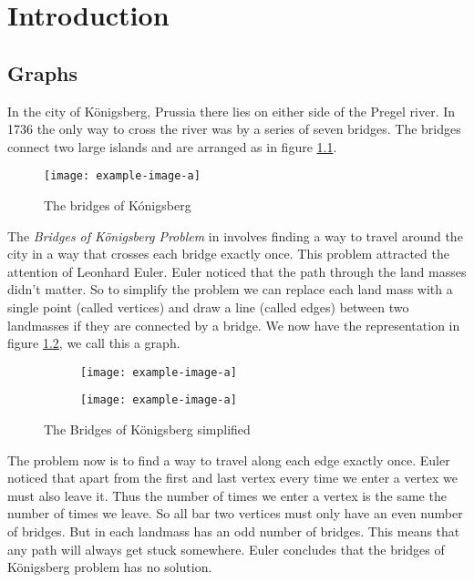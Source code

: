 \chapter{Introduction}\label{chpt:into}

\section{Graphs}
In the city of K\"{o}nigsberg, Prussia there lies on either side of the Pregel river. In 1736 the only way to cross the river was by a series of seven bridges. The bridges connect two large islands and are arranged as in figure \ref{fig:bridges1}. 
\begin{figure}[h]
    \centering
    \texttt{[image: example-image-a]}  %
    \caption{The bridges of K\'{o}nigsberg}
    \label{fig:bridges1}
\end{figure}
The \textit{Bridges of K\"{o}nigsberg Problem} in involves finding a way to travel around the city in a way that crosses each bridge exactly once. This problem attracted the attention of Leonhard Euler. Euler noticed that the path through the land masses didn't matter. So to simplify the problem we can replace each land mass with a single point (called vertices) and draw a line (called edges) between two landmasses if they are connected by a bridge. We now have the representation in figure \ref{fig:bridges2}, we call this a graph.
\begin{figure} [h]
    \centering
    \begin{subfigure}{.45\textwidth}
        \centering
        \texttt{[image: example-image-a]}  %
    \end{subfigure}
    \begin{subfigure}{.45\textwidth}
        \centering
        \texttt{[image: example-image-a]}  %
    \end{subfigure}
    \caption{The Bridges of K\"{o}nigsberg simplified}
    \label{fig:bridges2}
\end{figure} 
The problem now is to find a way to travel along each edge exactly once. Euler noticed that apart from the first and last vertex every time we enter a vertex we must also leave it. Thus the number of times we enter a vertex is the same the number of times we leave. So all bar two vertices must only have an even number of bridges. But in each landmass has an odd number of bridges. This means that any path will always get stuck somewhere. Euler concludes that the bridges of K\"{o}nigsberg problem has no solution.

